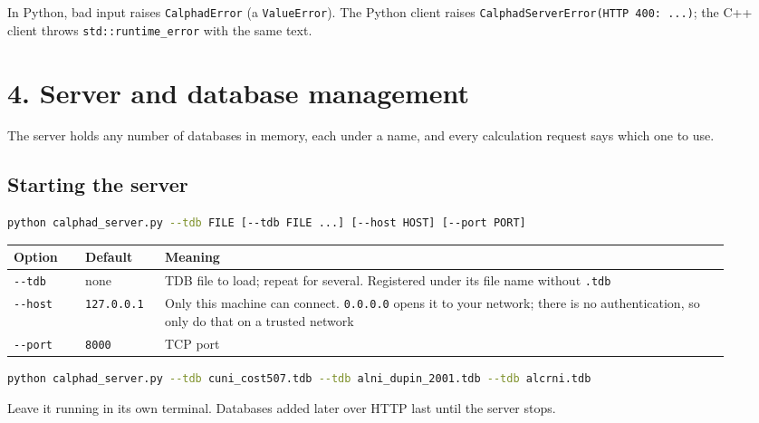 \documentclass[12pt,a4paper]{article}
\begin{document}
\endgroup
In Python, bad input raises \texttt{CalphadError} (a \texttt{ValueError}). The Python client raises \texttt{CalphadServerError(\textquotedbl{}HTTP 400: .\allowbreak{}.\allowbreak{}.\allowbreak{}\textquotedbl{})}; the C++ client throws \texttt{std::runtime\_\allowbreak{}error} with the same text.


\section*{4. Server and database management}
The server holds any number of databases in memory, each under a name, and every calculation request says which one to use.


\subsection*{Starting the server}
\begin{lstlisting}[basicstyle={\footnotesize\ttfamily},language=bash]
python calphad_server.py --tdb FILE [--tdb FILE ...] [--host HOST] [--port PORT]
\end{lstlisting}
\begingroup\small
\begin{longtable}{>{\raggedright\arraybackslash}p{0.094\linewidth}>{\raggedright\arraybackslash}p{0.108\linewidth}>{\raggedright\arraybackslash}p{0.719\linewidth}}
\toprule
\textbf{Option} & \textbf{Default} & \textbf{Meaning} \\
\midrule
\endhead
\texttt{-{}-{}tdb} & none & TDB file to load; repeat for several. Registered under its file name without \texttt{.\allowbreak{}tdb} \\
\texttt{-{}-{}host} & \texttt{127.\allowbreak{}0.\allowbreak{}0.\allowbreak{}1} & Only this machine can connect. \texttt{0.\allowbreak{}0.\allowbreak{}0.\allowbreak{}0} opens it to your network; there is no authentication, so only do that on a trusted network \\
\texttt{-{}-{}port} & \texttt{8000} & TCP port \\
\bottomrule
\end{longtable}
\endgroup
\begin{lstlisting}[basicstyle={\scriptsize\ttfamily},language=bash]
python calphad_server.py --tdb cuni_cost507.tdb --tdb alni_dupin_2001.tdb --tdb alcrni.tdb
\end{lstlisting}
Leave it running in its own terminal. Databases added later over HTTP last until the server stops.
\end{document}
